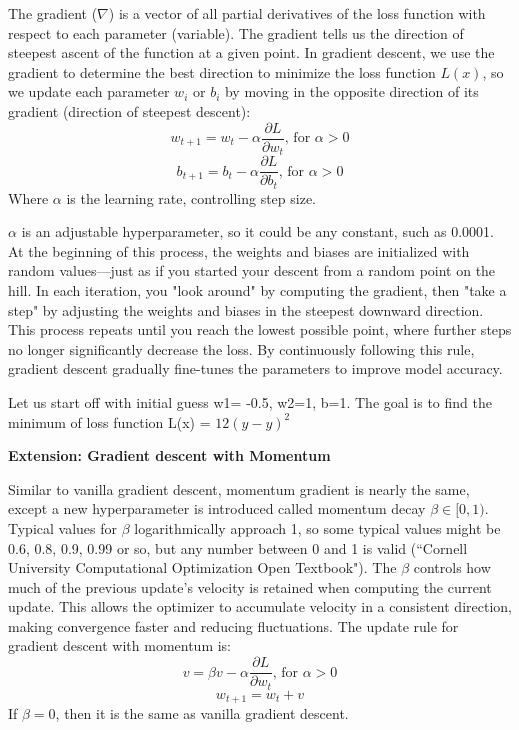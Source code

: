 \documentclass[12pt]{article}
\theoremstyle{definition}
\begin{document}
The gradient ($\nabla$) is a vector of all partial derivatives of the loss function with respect to each parameter (variable). The gradient tells us the direction of steepest ascent of the function at a given point. In gradient descent, we use the gradient to determine the best direction to minimize the loss function $L(x)$, so we update each parameter $w_i$ or $b_i$ by moving in the opposite direction of its gradient (direction of steepest descent):
\[
w_{t+1} = w_t - \alpha \frac{\partial L}{\partial w_t}\text{, for }\alpha > 0
\]
\[
b_{t+1} = b_t - \alpha \frac{\partial L}{\partial b_t}\text{, for }\alpha > 0
\]
Where $\alpha$ is the learning rate, controlling step size. 

$\alpha$ is an adjustable hyperparameter, so it could be any constant, such as 0.0001. At the beginning of this process, the weights and biases are initialized with random values—just as if you started your descent from a random point on the hill. In each iteration, you "look around" by computing the gradient, then "take a step" by adjusting the weights and biases in the steepest downward direction. This process repeats until you reach the lowest possible point, where further steps no longer significantly decrease the loss. By continuously following this rule, gradient descent gradually fine-tunes the parameters to improve model accuracy.

Let us start off with initial guess w1= -0.5, w2=1, b=1. The goal is to find the minimum of loss function L(x) = $12(y-y)^2$

\begin{flushleft}
\textbf{Extension: Gradient descent with Momentum}
\end{flushleft}
Similar to vanilla gradient descent, momentum gradient is nearly the same, except a new hyperparameter is introduced called momentum decay $\beta \in [0,1)$. Typical values for $\beta$ logarithmically approach 1, so some typical values might be 0.6, 0.8, 0.9, 0.99 or so, but any number between 0 and 1 is valid (``Cornell University Computational Optimization Open Textbook"). The $\beta$ controls how much of the previous update's velocity is retained when computing the current update. This allows the optimizer to accumulate velocity in a consistent direction, making convergence faster and reducing fluctuations. The update rule for gradient descent with momentum is:
\[
v = \beta v - \alpha \frac{\partial L}{\partial w_t}\text{, for }\alpha > 0
\]
\[
w_{t+1} = w_t + v
\]
If $\beta = 0$, then it is the same as vanilla gradient descent.
\end{document}
